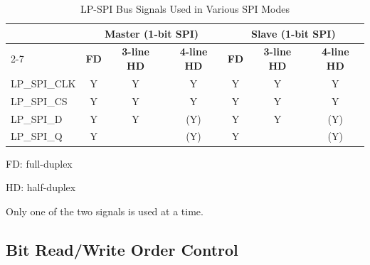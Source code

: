 \documentclass[main\_\_EN.tex]{subfiles}
\begin{document}
\begin{table}[H]
    \centering
    \caption{LP-SPI Bus Signals Used in Various SPI Modes}
    \label{tab:lpspi-bus-singals-used-in-various-spi-modes}

    \begin{threeparttable}
    \begin{tabular}{ |p{3.0cm} |c|c|c|c|c|c| }
    \hline
        \rowcolor{lightgray}
        & \multicolumn{3}{c|}{\textbf{Master (1-bit SPI)}} & \multicolumn{3}{c|}{\textbf{Slave (1-bit SPI)}} \\\cline{2-7}
        \rowcolor{lightgray}
        \rowcolor{lightgray}
        \multirow{-2}{*}{\textbf{LP\_SPI Bus Signal}} & \textbf{FD\tnote{1}} & \textbf{3-line HD\tnote{2}} & \textbf{4-line HD} & \textbf{FD} & \textbf{3-line HD} & \textbf{4-line HD}  \\ \hline
LP\_SPI\_CLK                & Y       & Y       & Y      & Y       & Y      & Y        \\ \hline
LP\_SPI\_CS                   & Y       & Y       & Y      & Y       & Y      & Y        \\ \hline
LP\_SPI\_D                    & Y       & Y       & (Y)\tnote{3}       & Y       & Y      & (Y)\tnote{3}    \\ \hline
LP\_SPI\_Q                  & Y       &         & (Y)\tnote{3}       & Y       &        & (Y)\tnote{3}      \\ \hline


\end{tabular}
        \begin{tablenotes}
                \item[1] FD: full-duplex
                \item[2] HD: half-duplex
                \item[3] Only one of the two signals is used at a time.
        \end{tablenotes}
     \end{threeparttable}
    \end{table}

\subsection{Bit Read/Write Order Control}
\end{document}
